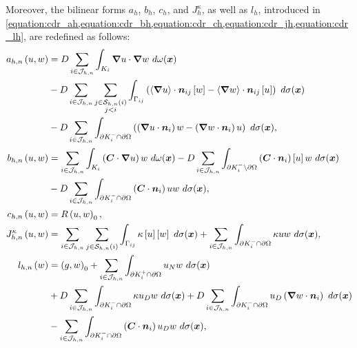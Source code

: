 Moreover, the bilinear forms $a_h$, $b_h$, $c_h$, and $J^{\kappa}_h$, as well as $l_h$, introduced in \cref{equation:cdr_ah,equation:cdr_bh,equation:cdr_ch,equation:cdr_jh,equation:cdr_lh}, are redefined as follows:
\begin{align}
    a_{h, n} \left( u, w \right) &= D \sum_{i \in \mathcal{J}_{h, n}} \int_{K_i} \bm{\nabla} u \cdot \bm{\nabla} w ~ d \omega(\bm{x}) \label{equation:cdr_ahn} \\
    &- D \sum_{i \in \mathcal{J}_{h, n}} \sum_{\substack{j \in \mathcal{S}_{h, n}(i) \\ j < i}} \int_{\Gamma_{ij}} \left( \left\langle \bm{\nabla} u \right\rangle \cdot \bm{n}_{ij} \left[ w \right] - \left\langle \bm{\nabla} w \right\rangle \cdot \bm{n}_{ij} \left[ u \right] \right) ~ d \sigma(\bm{x}) \notag \\
    &- D \sum_{i \in \mathcal{J}_{h, n}} \int_{\partial K_i^- \cap \partial \Omega} \left( \left( \bm{\nabla} u \cdot \bm{n}_i \right) w - \left( \bm{\nabla} w \cdot \bm{n}_i \right) u \right) ~ d \sigma(\bm{x}), \notag \\
    b_{h, n} \left( u, w \right) &= \sum_{i \in \mathcal{J}_{h, n}} \int_{K_i} \left( \bm{C} \cdot \bm{\nabla} u \right) w ~ d \omega(\bm{x}) \label{equation:cdr_bhn} - D \sum_{i \in \mathcal{J}_{h, n}} \int_{\partial K_i^- \setminus \partial \Omega} \left( \bm{C} \cdot \bm{n}_i \right) \left[ u \right] w ~ d \sigma(\bm{x}) \\
    &- D \sum_{i \in \mathcal{J}_{h, n}} \int_{\partial K_i^- \cap \partial \Omega} \left( \bm{C} \cdot \bm{n}_i \right) u w ~ d \sigma(\bm{x}), \notag \\
    c_{h, n} \left( u, w \right) &= R \left( u, w \right)_0, \label{equation:cdr_chn} \\
    J^{\kappa}_{h, n} \left( u, w \right) &= \sum_{i \in \mathcal{J}_{h, n}} \sum_{j \in \mathcal{S}_{h, n}(i)} \int_{\Gamma_{ij}} \kappa \left[ u \right] \left[ w \right] ~ d \sigma(\bm{x}) + \sum_{i \in \mathcal{J}_{h, n}} \int_{\partial K_i^- \cap \partial \Omega} \kappa u w ~ d \sigma(\bm{x}), \label{equation:cdr_jhn} \\
    l_{h, n} \left( w \right)  &= \left( g, w \right)_0 + \sum_{i \in \mathcal{J}_{h, n}} \int_{\partial K_i^+ \cap \partial \Omega} u_N w ~ d \sigma(\bm{x}) \label{equation:cdr_lhn} \\
    &+ D \sum_{i \in \mathcal{J}_{h, n}} \int_{\partial K_i^- \cap \partial \Omega} \kappa u_D w ~ d \sigma(\bm{x}) + D \sum_{i \in \mathcal{J}_{h, n}} \int_{\partial K_i^- \cap \partial \Omega} u_D \left( \bm{\nabla} w \cdot \bm{n}_i \right) ~ d \sigma(\bm{x}) \notag \\
    &- \sum_{i \in \mathcal{J}_{h, n}} \int_{\partial K_i^- \cap \partial \Omega} \left( \bm{C} \cdot \bm{n}_i \right) u_D w ~ d \sigma(\bm{x}) \notag,
\end{align}
